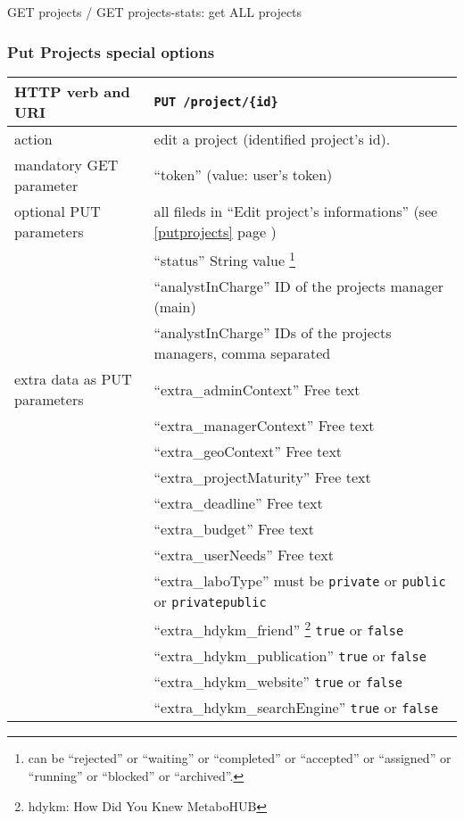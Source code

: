 \hspace*{\parindent}
GET projects / GET projects-stats: get ALL projects
\newline

\subsubsection{Put Projects special options}
\begin{tabular}{ | l | l | }
	\hline
	HTTP verb and URI & \texttt{PUT /project/\{id\}} \\
	\hline
	action & edit a project (identified \via project's id). \\
	\hline
	mandatory GET parameter & ``token'' (value: user's token) \\
	\hline
	optional PUT parameters & all fileds in ``Edit project’s informations'' (see \ref{putprojects} page \pageref{putprojects}) \\		
	\space & ``status'' String value \footnote{can be ``rejected'' or ``waiting'' or ``completed'' or ``accepted'' or ``assigned'' or ``running'' or ``blocked'' or ``archived''. } \\
	\space & ``analystInCharge'' ID of the projects manager (main) \\
	\space & ``analystInCharge'' IDs of the projects managers, comma separated \\
	\hline
	extra data as PUT parameters & ``extra\_adminContext'' Free text \\
	\space & ``extra\_managerContext'' Free text \\
	\space & ``extra\_geoContext'' Free text \\
	\space & ``extra\_projectMaturity'' Free text \\
	\space & ``extra\_deadline'' Free text \\
	\space & ``extra\_budget'' Free text \\
	\space & ``extra\_userNeeds'' Free text \\
	\space & ``extra\_laboType'' must be \texttt{private} or \texttt{public} or \texttt{privatepublic} \\
	\space & ``extra\_hdykm\_friend'' \footnote{hdykm: How Did You Knew MetaboHUB} \texttt{true} or \texttt{false} \\
	\space & ``extra\_hdykm\_publication'' \texttt{true} or \texttt{false} \\
	\space & ``extra\_hdykm\_website'' \texttt{true} or \texttt{false} \\
	\space & ``extra\_hdykm\_searchEngine'' \texttt{true} or \texttt{false} \\

\end{tabular}
